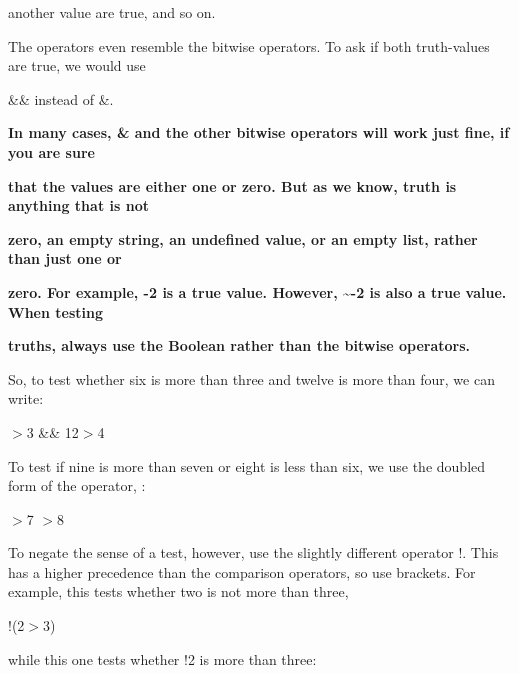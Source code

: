 \documentclass[a4paper,11pt]{book}
\begin{document}
\noindent another value are true, and so on.

\noindent 

\noindent The operators even resemble the bitwise operators. To ask if both truth-values are true, we would use

\noindent \&\& instead of   \&.

\noindent 

\noindent 

\noindent \textbf{In many cases, \& and the other bitwise operators will work just fine, if you are sure}

\noindent \textbf{that the values are either one or zero. But as we know, truth is anything that is not}

\noindent \textbf{zero, an empty string, an undefined value, or an empty list, rather than just one or}

\noindent \textbf{zero. For example, -2 is a true value. However, \~{}-2 is also a true value. When testing}

\noindent \textbf{truths, always use the Boolean rather than the bitwise operators.}

\noindent 

\noindent 

\noindent So, to test whether six is more than three and twelve is more than four, we can write:

\noindent 

\noindent 

$>$3 \&\& 12$>$4 

\noindent 

\noindent To test if nine is more than seven or eight is less than six, we use the doubled form of the \textbar  operator, \textbar \textbar :

\noindent 

\noindent 

$>$7 \textbar {}$>$8 

\noindent 

\noindent To  negate  the  sense of a test,  however,  use  the  slightly  different  operator  !.  This has  a  higher precedence than the comparison operators, so use brackets. For example, this tests whether two is not more than three,

\noindent 

\noindent 

\noindent !(2$>$3)

\noindent 

\noindent while this one tests whether !2 is more than three:
\end{document}
